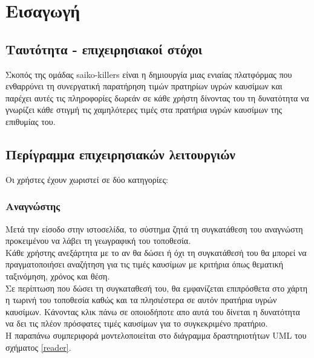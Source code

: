 \section{Εισαγωγή}

\subsection{Ταυτότητα - επιχειρησιακοί στόχοι}

Σκοπός της ομάδας saiko-killers είναι η δημιουργία μιας ενιαίας πλατφόρμας που ενθαρρύνει τη συνεργατική παρατήρηση τιμών πρατηρίων υγρών καυσίμων και παρέχει αυτές τις πληροφορίες δωρεάν σε κάθε χρήστη δίνοντας του τη δυνατότητα να γνωρίζει κάθε στιγμή τις χαμηλότερες τιμές στα πρατήρια υγρών καυσίμων της επιθυμίας του.

\subsection{Περίγραμμα επιχειρησιακών λειτουργιών}

Οι χρήστες έχουν χωριστεί σε δύο κατηγορίες:

\subsubsection*{Αναγνώστης}
Μετά την είσοδο στην ιστοσελίδα, το σύστημα ζητά τη συγκατάθεση του αναγνώστη προκειμένου να λάβει τη γεωγραφική του τοποθεσία. \\
Κάθε χρήστης ανεξάρτητα με το αν θα δώσει ή όχι τη συγκατάθεσή του θα μπορεί να πραγματοποιήσει αναζήτηση για τις τιμές καυσίμων με κριτήρια όπως θεματική ταξινόμηση, χρόνος και θέση.\\
Σε περίπτωση που δώσει τη συγκαταθεσή του, θα εμφανίζεται επιπρόσθετα στο χάρτη η τωρινή του τοποθεσία καθώς και τα πλησιέστερα σε αυτόν πρατήρια υγρών καυσίμων. Κάνοντας κλικ πάνω σε οποιοδήποτε απο αυτά του δίνεται η δυνατότητα να δει τις πλέον πρόσφατες τιμές καυσίμων για το συγκεκριμένο πρατήριο.\\
Η παραπάνω συμπεριφορά μοντελοποιείται στο διάγραμμα δραστηριοτήτων UML του σχήματος  \ref{reader}.

